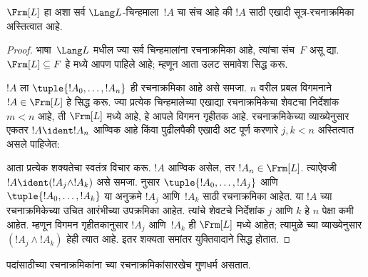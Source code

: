 \documentclass[../../../include/open-logic-section]{subfiles}
\begin{document}
\begin{thm}
$\Frm[L]$ हा अशा सर्व $\Lang L$-चिन्हमाला~$!A$ चा संच आहे की $!A$
साठी एखादी सूत्र-रचनाक्रमिका अस्तित्वात आहे.
\end{thm}

\begin{proof}
भाषा~$\Lang L$ मधील ज्या सर्व चिन्हमालांना रचनाक्रमिका आहे, त्यांचा
संच~$F$ असू द्या. $\Frm[L] \subseteq F$ हे
 मध्ये आपण पाहिले आहे; म्हणून आता उलट
समावेश सिद्ध करू.

$!A$ ला $\tuple{!A_0,\dotsc,!A_n}$ ही रचनाक्रमिका आहे असे समजा.
$n$ वरील प्रबल विगमनाने $!A \in \Frm[L]$ हे सिद्ध करू. ज्या प्रत्येक
चिन्हमालेच्या एखाद्या रचनाक्रमिकेचा शेवटचा निर्देशांक $m < n$ आहे, ती
$\Frm[L]$ मध्ये आहे, हे आपले विगमन गृहीतक आहे. रचनाक्रमिकेच्या
व्याख्येनुसार एकतर $!A \ident !A_n$ आण्विक आहे किंवा पुढीलपैकी एखादी
अट पूर्ण करणारे $j,k < n$ अस्तित्वात असले पाहिजेत:
\begin{enumerate}
\end{enumerate}
आता प्रत्येक शक्यतेचा स्वतंत्र विचार करू. $!A$ आण्विक असेल, तर
$!A_n \in \Frm[L]$. त्याऐवजी $!A \ident (!A_j \land !A_k)$ असे समजा.
 नुसार
$\tuple{!A_0,\dotsc,!A_j}$ आणि $\tuple{!A_0,\dotsc,!A_k}$ या अनुक्रमे
$!A_j$ आणि~$!A_k$ साठी रचनाक्रमिका आहेत. या $!A$ च्या
रचनाक्रमिकेच्या उचित आरंभीच्या उपक्रमिका आहेत. त्यांचे शेवटचे
निर्देशांक $j$ आणि $k$ हे $n$ पेक्षा कमी आहेत. म्हणून विगमन
गृहीतकानुसार $!A_j$ आणि~$!A_k$ ही
$\Frm[L]$ मध्ये आहेत; त्यामुळे च्या व्याख्येनुसार
$(!A_j \land !A_k)$ हेही त्यात आहे. इतर शक्यता समांतर युक्तिवादाने
सिद्ध होतात.
\end{proof}

पदांसाठीच्या रचनाक्रमिकांना च्या रचनाक्रमिकांसारखेच गुणधर्म
असतात.
\end{document}
